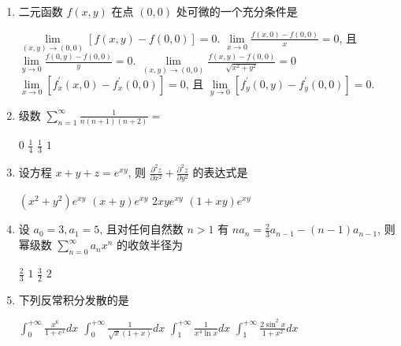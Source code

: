 \begin{enumerate}
\begin{enumerate}
\item 
二元函数 $f(x, y)$ 在点 $(0,0)$ 处可微的一个充分条件是  


\fourchoices
{$\lim\limits _{(x, y) \rightarrow(0,0)}[f(x, y)-f(0,0)]=0$.}
{$\lim\limits _{x \rightarrow 0} \frac{f(x, 0)-f(0,0)}{x}=0$, 且 $\lim\limits _{y \rightarrow 0} \frac{f(0, y)-f(0,0)}{y}=0$.}
{$\lim\limits _{(x, y) \rightarrow(0,0)} \frac{f(x, y)-f(0,0)}{\sqrt{x^{2}+y^{2}}}=0$}
{$\lim\limits _{x \rightarrow 0}\left[f_{x}^{\prime}(x, 0)-f_{x}^{\prime}(0,0)\right]=0$, 且 $\lim\limits _{y \rightarrow 0}\left[f_{y}^{\prime}(0, y)-f_{y}^{\prime}(0,0)\right]=0$.}
		
\item 
级数 $\sum\limits_{n=1}^{\infty} \frac{1}{n(n+1)(n+2)}=$   


\fourchoices
{$ 0 $}
{$\frac{1}{4}$}
{$\frac{1}{3}$}
{$ 1 $}

\item 
设方程 $x+y+z=e^{x y}$, 则 $\frac{\partial^{2} z}{\partial x^{2}}+\frac{\partial^{2} z}{\partial y^{2}}$ 的表达式是  


\fourchoices
{$\left(x^{2}+y^{2}\right) e^{x y}$}
{$(x+y) e^{x y}$}
{$2 x y e^{x y}$}
{$(1+x y) e^{x y}$}

\item 
设 $a_{0}=3, a_{1}=5$, 且对任何自然数 $n>1$ 有 $n a_{n}=\frac{2}{3} a_{n-1}-(n-1) a_{n-1}$, 则幂级数 $\sum\limits_{n=0}^{\infty} a_{n} x^{n}$ 的收敛半径为  


\fourchoices
{$\frac{2}{3}$}
{$ 1 $}
{$\frac{3}{2}$}
{$ 2 $}

\item 
下列反常积分发散的是  


\fourchoices
{$\int_{0}^{+\infty} \frac{x^{6}}{1+e^{x}} d x$}
{$\int_{0}^{+\infty} \frac{1}{\sqrt{x}(1+x)} d x$}
{$\int_{1}^{+\infty} \frac{1}{x^{4} \ln x} d x$}
{$\int_{1}^{+\infty} \frac{2 \sin ^{2} x}{1+x^{2}} d x$}

		
	\end{enumerate}


\end{enumerate}

